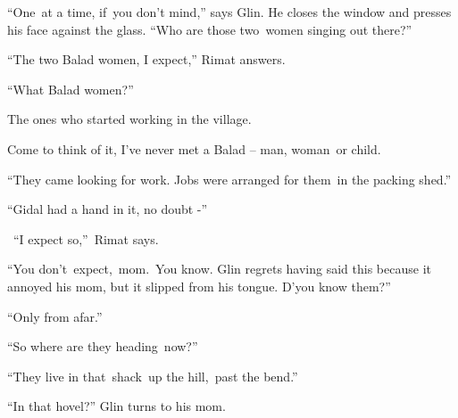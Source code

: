 \documentclass[letterpaper]{article}
\begin{document}
\textcolor[rgb]{0.13333334,0.13333334,0.13333334}{{}``One~at a time, if~you }don't
mind\textcolor[rgb]{0.13333334,0.13333334,0.13333334}{,'' says Glin. He closes the window and presses his face against
the glass}.\textcolor[rgb]{0.13333334,0.13333334,0.13333334}{ ``Who are those
}two\textcolor[rgb]{0.0,0.4392157,0.7529412}{\ }\textcolor[rgb]{0.13333334,0.13333334,0.13333334}{women singing out
there?''}

\textcolor[rgb]{0.13333334,0.13333334,0.13333334}{{}``The two Balad women, I
}expect\textcolor[rgb]{0.13333334,0.13333334,0.13333334}{,'' Rimat answers.}

\textcolor[rgb]{0.13333334,0.13333334,0.13333334}{{}``What Balad women?''}

{\textquotedbl}The ones who started working\textcolor[rgb]{0.13333334,0.13333334,0.13333334}{ in the
village.{\textquotedbl}\ \ \ \ \ \ \ \ }

\textcolor[rgb]{0.13333334,0.13333334,0.13333334}{{\textquotedbl}Come to think of it, I've never met a Balad -- man,
woman\ }or child.{\textquotedbl}

\textcolor[rgb]{0.13333334,0.13333334,0.13333334}{{}``They came looking for work. Jobs were arranged for them\ in the
packing }shed\textcolor[rgb]{0.13333334,0.13333334,0.13333334}{.''}

\textcolor[rgb]{0.13333334,0.13333334,0.13333334}{{}``Gidal had a hand in it, no doubt -{}''}

\textcolor[rgb]{0.13333334,0.13333334,0.13333334}{~``}I expect
so\textcolor[rgb]{0.13333334,0.13333334,0.13333334}{,''~Rimat says.\ }

\textcolor[rgb]{0.13333334,0.13333334,0.13333334}{{}``You
don't~}expect,~mom\textcolor[rgb]{0.13333334,0.13333334,0.13333334}{.~You know.{\textquotedbl} Glin regrets having said
this because it annoyed his  mom, but it slipped from his tongue.
{\textquotedbl}}D{}'y\textcolor[rgb]{0.13333334,0.13333334,0.13333334}{ou know them?''\ }

\textcolor[rgb]{0.13333334,0.13333334,0.13333334}{{}``Only from afar.''}

\textcolor[rgb]{0.13333334,0.13333334,0.13333334}{{}``So where are they heading~now?''}

\textcolor[rgb]{0.13333334,0.13333334,0.13333334}{{}``They live in that\ shack\ up the
hill,\ }past\textcolor[rgb]{0.13333334,0.13333334,0.13333334}{ the bend.''}

\textcolor[rgb]{0.13333334,0.13333334,0.13333334}{{}``In that hovel?'' Glin turns }to his
mom\textcolor[rgb]{0.13333334,0.13333334,0.13333334}{.}
\end{document}
